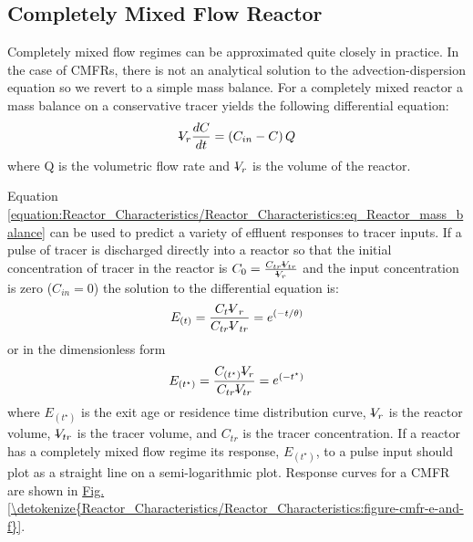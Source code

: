 \documentclass[letterpaper,10pt,english]{sphinxmanual}
\begin{document}
\subsection{Completely Mixed Flow Reactor}
\label{\detokenize{Reactor_Characteristics/Reactor_Characteristics:completely-mixed-flow-reactor}}
Completely mixed flow regimes can be approximated quite closely in practice. In the case of CMFRs, there is not an analytical solution to the advection-dispersion equation so we revert to a simple mass balance. For a completely mixed reactor a mass balance on a conservative tracer yields the following differential equation:
\begin{equation}\label{equation:Reactor_Characteristics/Reactor_Characteristics:eq_Reactor_mass_balance}
\begin{split} \rlap{-} V _{r} \frac{dC}{dt} =\left(C_{in} -C\right)Q\end{split}
\end{equation}
where Q is the volumetric flow rate and \(\rlap{-} V_r\) is the volume of the reactor.

Equation \eqref{equation:Reactor_Characteristics/Reactor_Characteristics:eq_Reactor_mass_balance} can be used to predict a variety of effluent responses to tracer inputs. If a pulse of tracer is discharged directly into a reactor so that the initial concentration of tracer in the reactor is \(C_{0} =\frac{C_{tr} \rlap{-} V _{tr} }{\rlap{-} V _{r} }\) and the input concentration is zero (\(C_{in} = 0\)) the solution to the differential equation is:
\begin{equation}\label{equation:Reactor_Characteristics/Reactor_Characteristics:Reactor_Characteristics/Reactor_Characteristics:2}
\begin{split}E_{\left(t\right)}=\frac{C_t{\rlap{-} V }_r}{C_{tr}{\rlap{-} V }_{tr}}=e^{\left(-t/\theta \right)}\end{split}
\end{equation}
or in the dimensionless form
\begin{equation}\label{equation:Reactor_Characteristics/Reactor_Characteristics:Reactor_Characteristics/Reactor_Characteristics:3}
\begin{split}E_{\left(t^{\star} \right)} =\frac{C_{\left(t^{\star} \right)} \rlap{-} V _{r} }{C_{tr} \rlap{-} V _{tr} } ={\mathop{e}\nolimits^{\left(-t^{\star} \right)}}\end{split}
\end{equation}
where \(E_{\left(t^{\star} \right)}\) is the exit age or residence time distribution curve, \(\rlap{-} V _{r}\) is the reactor volume, \(\rlap{-} V _{tr}\) is the tracer volume, and \(C_{tr}\) is the tracer concentration.  If a reactor has a completely mixed flow regime its response, \(E_{\left(t^{\star} \right)}\), to a pulse input should plot as a straight line on a semi-logarithmic plot. Response curves for a CMFR are shown in \hyperref[\detokenize{Reactor_Characteristics/Reactor_Characteristics:figure-cmfr-e-and-f}]{Fig.\@ \ref{\detokenize{Reactor_Characteristics/Reactor_Characteristics:figure-cmfr-e-and-f}}}.
\end{document}
